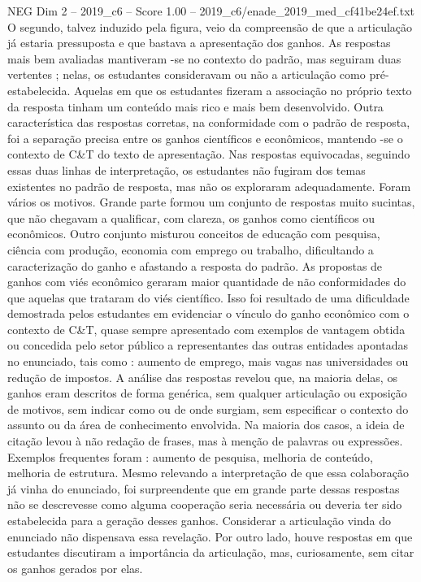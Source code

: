 \begin{textsample}{NEG Dim 2 – 2019\_c6 – Score 1.00 – 2019\_c6/enade\_2019\_med\_cf41be24ef.txt}
O segundo, talvez induzido pela figura, veio da compreensão de que a articulação já estaria pressuposta e que bastava a apresentação dos ganhos.
As respostas mais bem avaliadas mantiveram -se no contexto do padrão, mas seguiram duas vertentes ; nelas, os estudantes consideravam ou não a articulação como pré-estabelecida.
Aquelas em que os estudantes fizeram a associação no próprio texto da resposta tinham um conteúdo mais rico e mais bem desenvolvido.
Outra característica das respostas corretas, na conformidade com o padrão de resposta, foi a separação precisa entre os ganhos científicos e econômicos, mantendo -se o contexto de C\&T do texto de apresentação.
Nas respostas equivocadas, seguindo essas duas linhas de interpretação, os estudantes não fugiram dos temas existentes no padrão de resposta, mas não os exploraram adequadamente.
Foram vários os motivos.
Grande parte formou um conjunto de respostas muito sucintas, que não chegavam a qualificar, com clareza, os ganhos como científicos ou econômicos.
Outro conjunto misturou conceitos de educação com pesquisa, ciência com produção, economia com emprego ou trabalho, dificultando a caracterização do ganho e afastando a resposta do padrão.
As propostas de ganhos com viés econômico geraram maior quantidade de não conformidades do que aquelas que trataram do viés científico.
Isso foi resultado de uma dificuldade demostrada pelos estudantes em evidenciar o vínculo do ganho econômico com o contexto de C\&T, quase sempre apresentado com exemplos de vantagem obtida ou concedida pelo setor público a representantes das outras entidades apontadas no enunciado, tais como : aumento de emprego, mais vagas nas universidades ou redução de impostos.
A análise das respostas revelou que, na maioria delas, os ganhos eram descritos de forma genérica, sem qualquer articulação ou exposição de motivos, sem indicar como ou de onde surgiam, sem especificar o contexto do assunto ou da área de conhecimento envolvida.
Na maioria dos casos, a ideia de citação levou à não redação de frases, mas à menção de palavras ou expressões.
Exemplos frequentes foram : aumento de pesquisa, melhoria de conteúdo, melhoria de estrutura.
Mesmo relevando a interpretação de que essa colaboração já vinha do enunciado, foi surpreendente que em grande parte dessas respostas não se descrevesse como alguma cooperação seria necessária ou deveria ter sido estabelecida para a geração desses ganhos.
Considerar a articulação vinda do enunciado não dispensava essa revelação.
Por outro lado, houve respostas em que estudantes discutiram a importância da articulação, mas, curiosamente, sem citar os ganhos gerados por elas.

\end{textsample}
